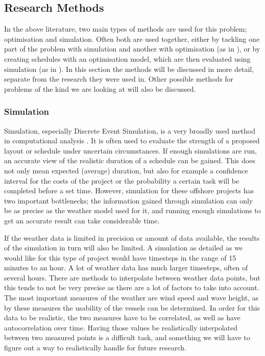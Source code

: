 \documentclass[a4paper,12pt]{article}
\begin{document}
\subsection{Research Methods} \label{ss:meth}
In the above literature, two main types of methods are used for this problem; optimisation and simulation. Often both are used together, either by tackling one part of the problem with simulation and another with optimisation (as in \cite{barlow2018mixed}), or by creating schedules with an optimisation model, which are then evaluated using simulation (as in \cite{kerkhove2017optimised}). In this section the methods will be discussed in more detail, separate from the research they were used in. Other possible methods for problems of the kind we are looking at will also be discussed. 

\bigskip

\subsubsection{Simulation} \label{sss:sim}
Simulation, especially Discrete Event Simulation, is a very broadly used method in computational analysis \cite{law2000simulation,robinson2010conceptual}. It is often used to evaluate the strength of a proposed layout or schedule under uncertain circumstances. If enough simulations are run, an accurate view of the realistic duration of a schedule can be gained. This does not only mean expected (average) duration, but also for example a confidence interval for the costs of the project or the probability a certain task will be completed before a set time. However, simulation for these offshore projects has two important bottlenecks; the information gained through simulation can only be as precise as the weather model used for it, and running enough simulations to get an accurate result can take considerable time. 

\bigskip

If the weather data is limited in precision or amount of data available, the results of the simulation in turn will also be limited. A simulation as detailed as we would like for this type of project would have timesteps in the range of 15 minutes to an hour. A lot of weather data has much larger timesteps, often of several hours. There are methods to interpolate between weather data points, but this tends to not be very precise as there are a lot of factors to take into account. The most important measures of the weather are wind speed and wave height, as by these measures the usability of the vessels can be determined. In order for this data to be realistic, the two measures have to be correlated, as well as have autocorrelation over time. Having those values be realistically interpolated between two measured points is a difficult task, and something we will have to figure out a way to realistically handle for future research.
\end{document}
